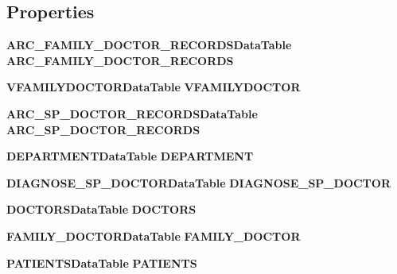 \subsection*{Properties}
\begin{CompactItemize}
\item 
{\bf ARC\_\-FAMILY\_\-DOCTOR\_\-RECORDSDataTable} \textbf{ARC\_\-FAMILY\_\-DOCTOR\_\-RECORDS}\hspace{0.3cm}{\tt  [get]}\label{class_automatic_medical_system_1_1_data_set1_12b965c329a215b0f7e8c741eab9dd19}

\item 
{\bf VFAMILYDOCTORDataTable} \textbf{VFAMILYDOCTOR}\hspace{0.3cm}{\tt  [get]}\label{class_automatic_medical_system_1_1_data_set1_387f609a71fe5650612a97ebcd031faa}

\item 
{\bf ARC\_\-SP\_\-DOCTOR\_\-RECORDSDataTable} \textbf{ARC\_\-SP\_\-DOCTOR\_\-RECORDS}\hspace{0.3cm}{\tt  [get]}\label{class_automatic_medical_system_1_1_data_set1_276d2e8a07a29183149e5c277ab616fd}

\item 
{\bf DEPARTMENTDataTable} \textbf{DEPARTMENT}\hspace{0.3cm}{\tt  [get]}\label{class_automatic_medical_system_1_1_data_set1_8454053aea48fab5eb063db50911c547}

\item 
{\bf DIAGNOSE\_\-SP\_\-DOCTORDataTable} \textbf{DIAGNOSE\_\-SP\_\-DOCTOR}\hspace{0.3cm}{\tt  [get]}\label{class_automatic_medical_system_1_1_data_set1_fa27b5cdc43a1d4bc5d683a61ca24b26}

\item 
{\bf DOCTORSDataTable} \textbf{DOCTORS}\hspace{0.3cm}{\tt  [get]}\label{class_automatic_medical_system_1_1_data_set1_888389a8b2218d43f94e107dab7589ee}

\item 
{\bf FAMILY\_\-DOCTORDataTable} \textbf{FAMILY\_\-DOCTOR}\hspace{0.3cm}{\tt  [get]}\label{class_automatic_medical_system_1_1_data_set1_b96295ee6567b244d75b8c3affaf34ad}

\item 
{\bf PATIENTSDataTable} \textbf{PATIENTS}\hspace{0.3cm}{\tt  [get]}\label{class_automatic_medical_system_1_1_data_set1_e8cc8d3f1ebb2111d4417d7fedff6b6a}


\end{CompactItemize}
